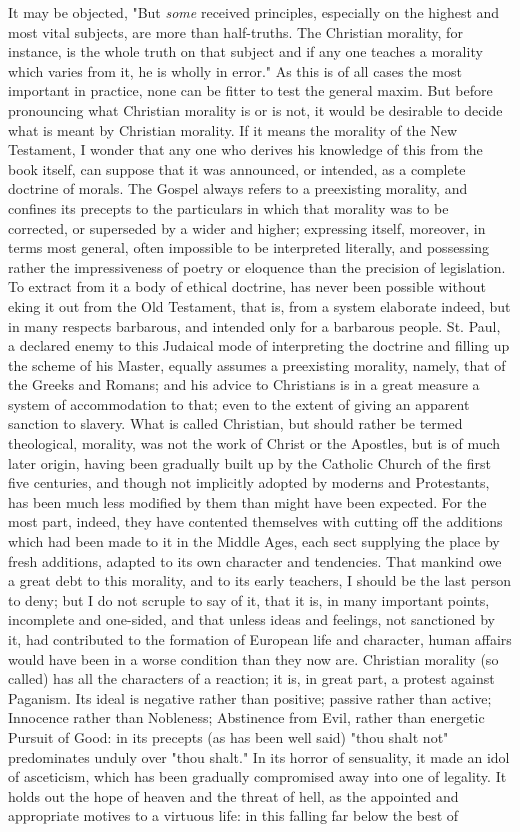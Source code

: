\documentclass[12pt]{report}
\begin{document}
It may be objected, "But \emph{some} received principles, especially on the highest and most vital subjects, are more than half-truths. The Christian morality, for instance, is the whole truth on that subject and if any one teaches a morality which varies from it, he is wholly in error." As this is of all cases the most important in practice, none can be fitter to test the general maxim. But before pronouncing what Christian morality is or is not, it would be desirable to decide what is meant by Christian morality. If it means the morality of the New Testament, I wonder that any one who derives his knowledge of this from the book itself, can suppose that it was announced, or intended, as a complete doctrine of morals. The Gospel always refers to a preexisting morality, and confines its precepts to the particulars in which that morality was to be corrected, or superseded by a wider and higher; expressing itself, moreover, in terms most general, often impossible to be interpreted literally, and possessing rather the impressiveness of poetry or eloquence than the precision of legislation. To extract from it a body of ethical doctrine, has never been possible without eking it out from the Old Testament, that is, from a system elaborate indeed, but in many respects barbarous, and intended only for a barbarous people. St. Paul, a declared enemy to this Judaical mode of interpreting the doctrine and filling up the scheme of his Master, equally assumes a preexisting morality, namely, that of the Greeks and Romans; and his advice to Christians is in a great measure a system of accommodation to that; even to the extent of giving an apparent sanction to slavery. What is called Christian, but should rather be termed theological, morality, was not the work of Christ or the Apostles, but is of much later origin, having been gradually built up by the Catholic Church of the first five centuries, and though not implicitly adopted by moderns and Protestants, has been much less modified by them than might have been expected. For the most part, indeed, they have contented themselves with cutting off the additions which had been made to it in the Middle Ages, each sect supplying the place by fresh additions, adapted to its own character and tendencies. That mankind owe a great debt to this morality, and to its early teachers, I should be the last person to deny; but I do not scruple to say of it, that it is, in many important points, incomplete and one-sided, and that unless ideas and feelings, not sanctioned by it, had contributed to the formation of European life and character, human affairs would have been in a worse condition than they now are. Christian morality (so called) has all the characters of a reaction; it is, in great part, a protest against Paganism. Its ideal is negative rather than positive; passive rather than active; Innocence rather than Nobleness; Abstinence from Evil, rather than energetic Pursuit of Good: in its precepts (as has been well said) "thou shalt not" predominates unduly over "thou shalt." In its horror of sensuality, it made an idol of asceticism, which has been gradually compromised away into one of legality. It holds out the hope of heaven and the threat of hell, as the appointed and appropriate motives to a virtuous life: in this falling far below the best of 
\end{document}
